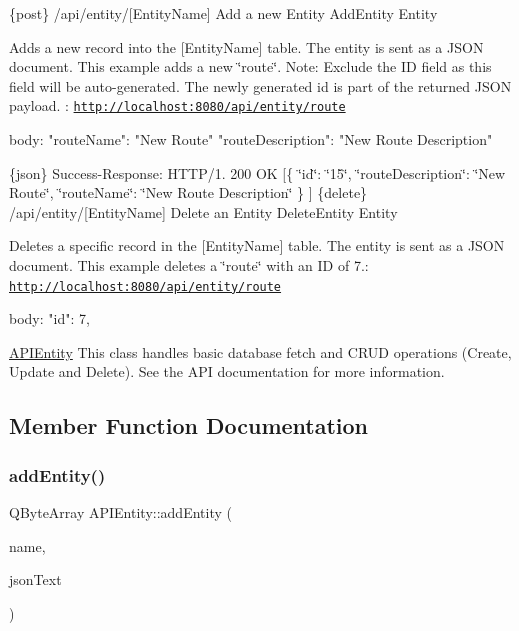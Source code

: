 \{post\} /api/entity/\mbox{[}Entity\+Name\mbox{]} Add a new Entity  Add\+Entity  Entity

Adds a new record into the \mbox{[}Entity\+Name\mbox{]} table. The entity is sent as a J\+S\+ON document.  This example adds a new \char`\"{}route\char`\"{}. Note\+: Exclude the ID field as this field will be auto-\/generated. The newly generated id is part of the returned J\+S\+ON payload. \+: \href{http://localhost:8080/api/entity/route}{\tt http\+://localhost\+:8080/api/entity/route} \begin{DoxyVerb}body:
{
  "routeName": "New Route"
  "routeDescription": "New Route Description"
}
\end{DoxyVerb}


\{json\} Success-\/\+Response\+: H\+T\+T\+P/1. 200 OK \mbox{[}\{ \char`\"{}id\char`\"{}\+: \char`\"{}15\char`\"{}, \char`\"{}route\+Description\char`\"{}\+: \char`\"{}\+New Route\char`\"{}, \char`\"{}route\+Name\char`\"{}\+: \char`\"{}\+New Route Description\char`\"{} \} \mbox{]}  \{delete\} /api/entity/\mbox{[}Entity\+Name\mbox{]} Delete an Entity  Delete\+Entity  Entity

Deletes a specific record in the \mbox{[}Entity\+Name\mbox{]} table. The entity is sent as a J\+S\+ON document.  This example deletes a \char`\"{}route\char`\"{} with an ID of 7.\+: \href{http://localhost:8080/api/entity/route}{\tt http\+://localhost\+:8080/api/entity/route} \begin{DoxyVerb}body:
{
  "id": 7,
}\end{DoxyVerb}
 \hyperlink{class_a_p_i_entity}{A\+P\+I\+Entity} This class handles basic database fetch and C\+R\+UD operations (Create, Update and Delete). See the A\+PI documentation for more information. 

\subsection{Member Function Documentation}
\mbox{\label{class_a_p_i_entity_a8bbe43bbc389472d7a7fd9e8a2283c82}} 
\subsubsection{\texorpdfstring{add\+Entity()}{addEntity()}}
{\footnotesize\ttfamily Q\+Byte\+Array A\+P\+I\+Entity\+::add\+Entity (\begin{DoxyParamCaption}\item[{const Q\+String \&}]{name,  }\item[{const Q\+String \&}]{json\+Text }\end{DoxyParamCaption})}


